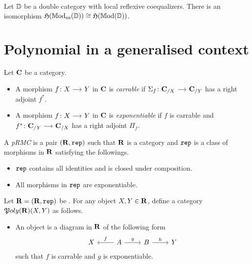 \documentclass[a4paper,dvipsnames, 11pt]{amsart} %
\begin{document}
\begin{lemma}
	Let $\mathbb{D}$ be a double category with local reflexive coequalizers.
	There is an isomorphism ${\mathfrak{H}}(\mathbb{M}\mathrm{od}_{\mathtt{co}}(\mathbb{D}))\cong{\mathfrak{H}}(\mathbb{M}\mathrm{od}(\mathbb{D}))$.
\end{lemma}
\begin{definition}
\end{definition}
\section{Polynomial in a generalised context}
\begin{definition}
	Let $\mathbf{C}$ be a category.
	\begin{itemize}
		\item %
			A morphism $f\colon X\arr Y$ in $\mathbf{C}$ is \emph{carrable} if
			$\Sigma_f\colon\one{C}_{/X}\arr\one{C}_{/Y}$ has a right adjoint $f^*$.
		\item %
			A morphism $f\colon X\arr Y$ in $\mathbf{C}$ is \emph{exponentiable} if $f$
			is carrable and $f^*\colon\one{C}_{/Y}\arr\one{C}_{/X}$ has a right adjoint $\Pi_f$.
		\qedhere %
	\end{itemize}
\end{definition}
\begin{definition}
	A \emph{\ac{pRMC}} is a pair $(\mathbf{R},\mathtt{rep})$
	such that $\mathbf{R}$ is a category
	and $\mathtt{rep}$ is a class of morphisms in $\mathbf{R}$ satisfying the followings.
	\begin{itemize}
		\item %
			$\mathtt{rep}$ contains all identities and is closed under composition.
		\item %
			All morphisms in $\mathtt{rep}$ are exponentiable.
		\qedhere %
	\end{itemize}
\end{definition}
\begin{definition}
	Let $\mathbf{R}=(\mathbf{R},\mathtt{rep})$ be .
	For any object $X,Y\in\mathbf{R}$,
	define a category ${\mathfrak{P}}{oly}(\mathbf{R})(X,Y)$ as follows.
	\begin{itemize}
		\item %
			An object is a diagram in $\mathbf{R}$
			of the following form
			\[
				\begin{tikzcd}
					X
					&
					A
					\ar[l,"f"']
					\ar[r,"g"]
					&
					B
					\ar[r,"h"]
					&
					Y
				\end{tikzcd}
			\]
			such that $f$ is carrable and $g$ is exponentiable.
	\end{itemize}
\end{definition}

%
%
\printbibliography
\end{document}
